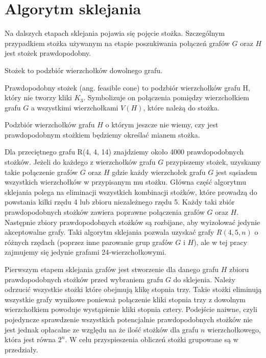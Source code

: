 \section{Algorytm sklejania}

Na dalszych etapach sklejania pojawia się pojęcie stożka. Szczególnym przypadkiem stożka używanym na etapie poszukiwania połączeń grafów $G$ oraz $H$ jest stożek prawdopodobny.

\begin{definition} Stożek to podzbiór wierzchołków dowolnego grafu.
\end{definition}

\begin{definition}
Prawdopodobny stożek (ang. feasible cone) to podzbiór wierzchołków grafu H, który nie tworzy kliki $K_3$\cite{mainpaper}. Symbolizuje on połączenia pomiędzy wierzchołkiem grafu $G$ a wszystkimi wierzchołkami $V(H)$, które należą do stożka.
\end{definition}

Podzbiór wierzchołków grafu $H$ o którym jeszcze nie wiemy, czy jest prawdopodobnym stożkiem będziemy  określać mianem stożka.

Dla przeciętnego grafu R(4, 4, 14) znajdziemy około 4000 prawdopodobnych stożków. Jeżeli do każdego z wierzchołków grafu $G$ przypiszemy stożek, uzyskamy takie połączenie grafów $G$ oraz $H$ gdzie każdy wierzchołek grafu $G$ jest sąsiadem wszystkich wierzchołków w przypisanym mu stożku. Główna część algorytmu sklejania polega na eliminacji wszystkich kombinacji stożków, które prowadzą do powstania kilki rzędu 4 lub zbioru niezależnego rzędu 5. Każdy taki zbiór prawdopodobnych stożków zawiera poprawne połączenia grafów $G$ oraz $H$. Następnie zbiory prawdopodobnych stożków są rozbijane, aby wyizolować jedynie akceptowalne grafy. Taki algorytm sklejania pozwala uzyskać grafy $R(4,5,n)$ o różnych rzędach (poprzez inne parowanie grup grafów $G$ i $H$), ale w tej pracy zajmujemy się jedynie grafami 24-wierzchołkowymi.

Pierwszym etapem sklejania grafów jest stworzenie dla danego grafu $H$ zbioru prawdopodobnych stożków przed wybraniem grafu $G$ do sklejenia. Należy odrzucić wszystkie stożki które obejmują klikę stopnia trzy. Takie stożki eliminują wszystkie grafy wynikowe ponieważ połączenie kliki stopnia trzy z dowolnym wierzchołkiem powoduje wystąpienie kliki stopnia cztery. Podejście naiwne, czyli pojedyncze sprawdzenie wszystkich potencjalnie prawdopodobnych stożków nie jest jednak opłacalne ze względu na że ilość stożków dla grafu $n$ wierzchołkowego, która jest równa $2^n$. W celu przyspieszenia obliczeń stożki grupowane są w przedziały. 

